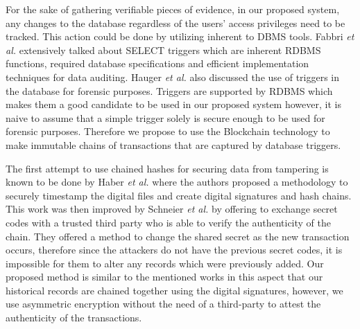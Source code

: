 For the sake of gathering verifiable pieces of evidence, in our proposed system, any changes to the database regardless of the users' access privileges need to be tracked. This action could be done by utilizing inherent to DBMS tools. Fabbri {\it et al.} \cite{fabbri2013select} extensively talked about SELECT triggers which are inherent RDBMS functions, required database specifications and efficient implementation techniques for data auditing. Hauger {\it et al.}\cite{hauger2014information} also discussed the use of triggers in the database for forensic purposes. Triggers are supported by RDBMS which makes them a good candidate to be used in our proposed system however, it is naive to assume that a simple trigger solely is secure enough to be used for forensic purposes. Therefore we propose to use the Blockchain technology to make immutable chains of transactions that are captured by database triggers.

The first attempt to use chained hashes for securing data from tampering is known to be done by Haber {\it et al.} \cite{haber1991how} where the authors proposed a methodology to securely timestamp the digital files and create digital signatures and hash chains. This work was then improved by Schneier {\it et al.} \cite{schneier1998cryptoraphic} \cite{schneier1999minimizing} \cite{schneier1999secure} by offering to exchange secret codes with a trusted third party who is able to verify the authenticity of the chain. They offered a method to change the shared secret as the new transaction occurs, therefore since the attackers do not have the previous secret codes, it is impossible for them to alter any records which were previously added. Our proposed method is similar to the mentioned works in this aspect that our historical records are chained together using the digital signatures, however, we use asymmetric encryption without the need of a third-party to attest the authenticity of the transactions.